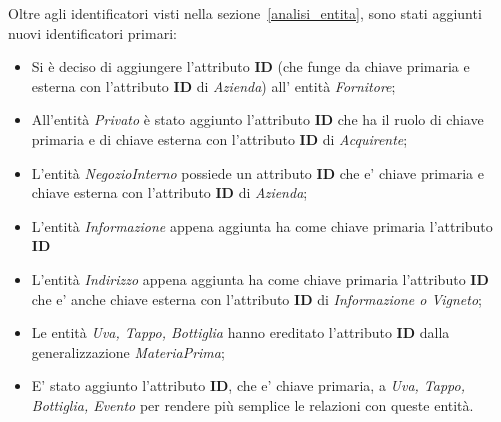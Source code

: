 Oltre agli identificatori visti nella sezione~\ref{analisi_entita}, sono stati aggiunti nuovi identificatori primari:

\begin{itemize}
	\item Si è deciso di aggiungere l'attributo \textbf{ID} (che funge da chiave primaria e esterna con l'attributo \textbf{ID} di \emph{Azienda}) all' entità \emph{Fornitore};
	\item All'entità \emph{Privato} è stato aggiunto l'attributo \textbf{ID} che ha il ruolo di chiave primaria e di chiave esterna con l'attributo \textbf{ID} di \emph{Acquirente};
	\item L'entità \emph{NegozioInterno} possiede un attributo \textbf{ID} che e' chiave primaria e chiave esterna con l'attributo \textbf{ID} di \emph{Azienda};
	\item L'entità \emph{Informazione} appena aggiunta ha come chiave primaria l'attributo \textbf{ID}
	\item L'entità \emph{Indirizzo} appena aggiunta ha come chiave primaria l'attributo \textbf{ID} che e' anche chiave esterna con l'attributo \textbf{ID} di \emph{Informazione o Vigneto};
	\item Le entità \emph{Uva, Tappo, Bottiglia} hanno ereditato l'attributo \textbf{ID} dalla generalizzazione \emph{MateriaPrima};
	\item E' stato aggiunto l'attributo \textbf{ID}, che e' chiave primaria, a \emph{Uva, Tappo, Bottiglia, Evento} per rendere più semplice le relazioni con queste entità.
\end{itemize}
